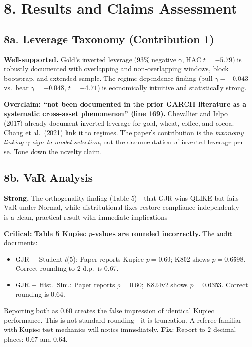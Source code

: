 \documentclass[12pt,a4paper]{article}
\begin{document}
\section*{8. Results and Claims Assessment}

\subsection*{8a. Leverage Taxonomy (Contribution 1)}

\textcolor{okgreen}{\textbf{Well-supported.}} Gold's inverted leverage (93\% negative $\gamma$, HAC $t = -5.79$) is robustly documented with overlapping and non-overlapping windows, block bootstrap, and extended sample. The regime-dependence finding (bull $\gamma = -0.043$ vs.\ bear $\gamma = +0.048$, $t = -4.71$) is economically intuitive and statistically strong.

\textcolor{warncolor}{\textbf{Overclaim: ``not been documented in the prior GARCH literature as a systematic cross-asset phenomenon'' (line 169).}} Chevallier and Ielpo (2017) already document inverted leverage for gold, wheat, coffee, and cocoa. Chang et al.\ (2021) link it to regimes. The paper's contribution is the \textit{taxonomy linking $\gamma$ sign to model selection}, not the documentation of inverted leverage per se. Tone down the novelty claim.

\subsection*{8b. VaR Analysis}

\textcolor{okgreen}{\textbf{Strong.}} The orthogonality finding (Table 5)---that GJR wins QLIKE but fails VaR under Normal, while distributional fixes restore compliance independently---is a clean, practical result with immediate implications.

\textcolor{errorred}{\textbf{Critical: Table 5 Kupiec $p$-values are rounded incorrectly.}} The audit documents:
\begin{itemize}[nosep]
\item GJR + Student-$t$(5): Paper reports Kupiec $p = 0.60$; K802 shows $p = 0.6698$. Correct rounding to 2 d.p.\ is 0.67.
\item GJR + Hist.\ Sim.: Paper reports $p = 0.60$; K824v2 shows $p = 0.6353$. Correct rounding is 0.64.
\end{itemize}
Reporting both as 0.60 creates the false impression of identical Kupiec performance. This is not standard rounding---it is truncation. A referee familiar with Kupiec test mechanics will notice immediately. \textbf{Fix}: Report to 2 decimal places: 0.67 and 0.64.
\end{document}
